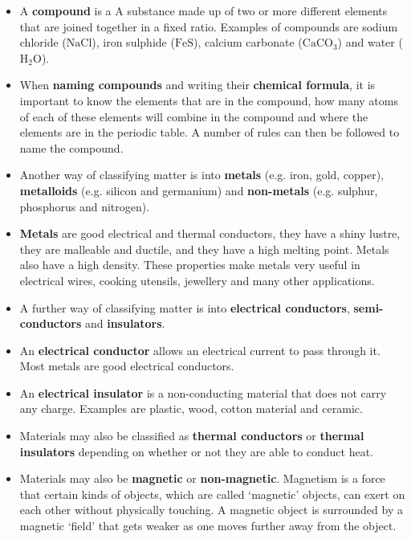 \begin{itemize}[noitemsep]
\label{m38706*uid124}\item A \textbf{compound} is a A substance made up of two or more different elements that are joined together in a fixed ratio. Examples of compounds are sodium chloride ($\text{NaCl}$), iron sulphide ($\text{FeS}$), calcium carbonate (${\text{CaCO}}_{3}$) and water (${\text{H}}_{2}\text{O}$).
\label{m38706*uid125}\item When \textbf{naming compounds} and writing their \textbf{chemical formula}, it is important to know the elements that are in the compound, how many atoms of each of these elements will combine in the compound and where the elements are in the periodic table. A number of rules can then be followed to name the compound.
\label{m38706*uid126}\item Another way of classifying matter is into \textbf{metals} (e.g. iron, gold, copper), \textbf{metalloids} (e.g. silicon and germanium) and \textbf{non-metals} (e.g. sulphur, phosphorus and nitrogen).
\label{m38706*uid127}\item \textbf{Metals} are good electrical and thermal conductors, they have a shiny lustre, they are malleable and ductile, and they have a high melting point. Metals also have a high density. These properties make metals very useful in electrical wires, cooking utensils, jewellery and many other applications.
\label{m38706*uid128}\item A further way of classifying matter is into \textbf{electrical conductors}, \textbf{semi-conductors} and \textbf{insulators}.
\label{m38706*uid129}\item An \textbf{electrical conductor} allows an electrical current to pass through it. Most metals are good electrical conductors.
\label{m38706*uid130}\item An \textbf{electrical insulator} is a non-conducting material that does not carry any charge. Examples are plastic, wood, cotton material and ceramic.
\label{m38706*uid131}\item Materials may also be classified as \textbf{thermal conductors} or \textbf{thermal insulators} depending on whether or not they are able to conduct heat.
\label{m38706*uid132}\item Materials may also be \textbf{magnetic} or \textbf{non-magnetic}. Magnetism is a force that certain kinds of objects, which are called ‘magnetic’ objects, can exert on each other without physically touching. A magnetic object is surrounded by a magnetic ‘field’ that gets weaker as one moves further away from the object.

\end{itemize} \pagebreak

